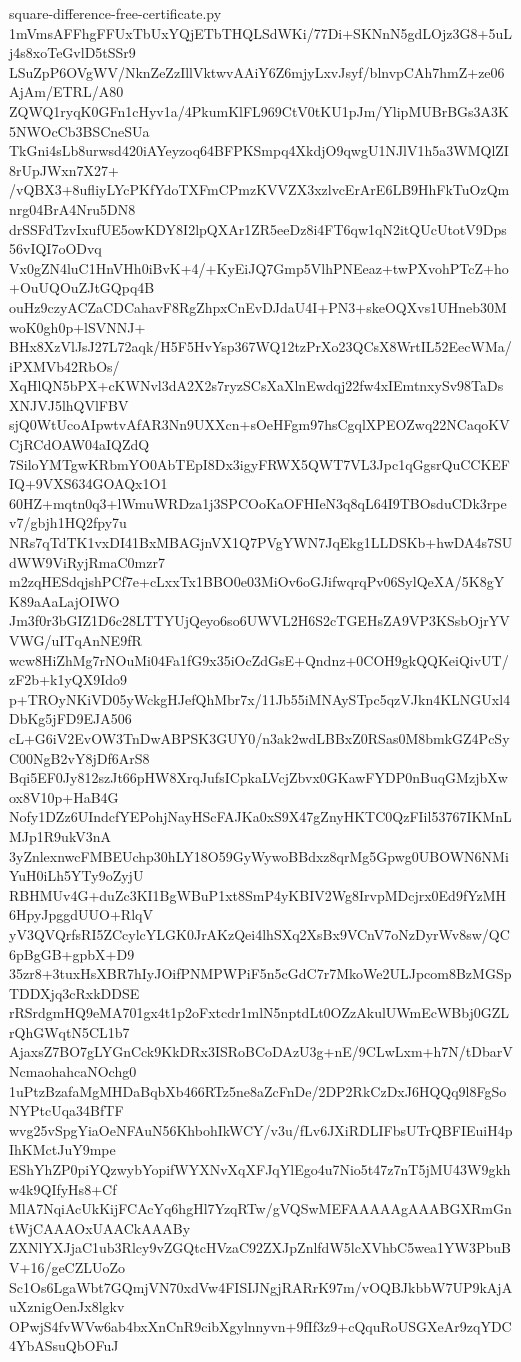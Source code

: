 \documentclass[11pt]{article}
\theoremstyle{definition}
\theoremstyle{remark}
\begin{document}
\begin{filecontents*}[overwrite]{square-difference-free-certificate.py}
1mVmsAFFhgFFUxTbUxYQjETbTHQLSdWKi/77Di+SKNnN5gdLOjz3G8+5uLj4s8xoTeGvlD5tSSr9
LSuZpP6OVgWV/NknZeZzIllVktwvAAiY6Z6mjyLxvJsyf/blnvpCAh7hmZ+ze06AjAm/ETRL/A80
ZQWQ1ryqK0GFn1cHyv1a/4PkumKlFL969CtV0tKU1pJm/YlipMUBrBGs3A3K5NWOcCb3BSCneSUa
TkGni4sLb8urwsd420iAYeyzoq64BFPKSmpq4XkdjO9qwgU1NJlV1h5a3WMQlZI8rUpJWxn7X27+
/vQBX3+8ufliyLYcPKfYdoTXFmCPmzKVVZX3xzlvcErArE6LB9HhFkTuOzQmnrg04BrA4Nru5DN8
drSSFdTzvIxufUE5owKDY8I2lpQXAr1ZR5eeDz8i4FT6qw1qN2itQUcUtotV9Dps56vIQI7oODvq
Vx0gZN4luC1HnVHh0iBvK+4/+KyEiJQ7Gmp5VlhPNEeaz+twPXvohPTcZ+ho+OuUQOuZJtGQpq4B
ouHz9czyACZaCDCahavF8RgZhpxCnEvDJdaU4I+PN3+skeOQXvs1UHneb30MwoK0gh0p+lSVNNJ+
BHx8XzVlJsJ27L72aqk/H5F5HvYsp367WQ12tzPrXo23QCsX8WrtIL52EecWMa/iPXMVb42RbOs/
XqHlQN5bPX+cKWNvl3dA2X2s7ryzSCsXaXlnEwdqj22fw4xIEmtnxySv98TaDsXNJVJ5lhQVlFBV
sjQ0WtUcoAIpwtvAfAR3Nn9UXXcn+sOeHFgm97hsCgqlXPEOZwq22NCaqoKVCjRCdOAW04aIQZdQ
7SiloYMTgwKRbmYO0AbTEpI8Dx3igyFRWX5QWT7VL3Jpc1qGgsrQuCCKEFIQ+9VXS634GOAQx1O1
60HZ+mqtn0q3+lWmuWRDza1j3SPCOoKaOFHIeN3q8qL64I9TBOsduCDk3rpev7/gbjh1HQ2fpy7u
NRs7qTdTK1vxDI41BxMBAGjnVX1Q7PVgYWN7JqEkg1LLDSKb+hwDA4s7SUdWW9ViRyjRmaC0mzr7
m2zqHESdqjshPCf7e+cLxxTx1BBO0e03MiOv6oGJifwqrqPv06SylQeXA/5K8gYK89aAaLajOIWO
Jm3f0r3bGIZ1D6c28LTTYUjQeyo6so6UWVL2H6S2cTGEHsZA9VP3KSsbOjrYVVWG/uITqAnNE9fR
wcw8HiZhMg7rNOuMi04Fa1fG9x35iOcZdGsE+Qndnz+0COH9gkQQKeiQivUT/zF2b+k1yQX9Ido9
p+TROyNKiVD05yWckgHJefQhMbr7x/11Jb55iMNAySTpc5qzVJkn4KLNGUxl4DbKg5jFD9EJA506
cL+G6iV2EvOW3TnDwABPSK3GUY0/n3ak2wdLBBxZ0RSas0M8bmkGZ4PcSyC00NgB2vY8jDf6ArS8
Bqi5EF0Jy812szJt66pHW8XrqJufsICpkaLVcjZbvx0GKawFYDP0nBuqGMzjbXwox8V10p+HaB4G
Nofy1DZz6UIndcfYEPohjNayHScFAJKa0xS9X47gZnyHKTC0QzFIil53767IKMnLMJp1R9ukV3nA
3yZnlexnwcFMBEUchp30hLY18O59GyWywoBBdxz8qrMg5Gpwg0UBOWN6NMiYuH0iLh5YTy9oZyjU
RBHMUv4G+duZc3KI1BgWBuP1xt8SmP4yKBIV2Wg8IrvpMDcjrx0Ed9fYzMH6HpyJpggdUUO+RlqV
yV3QVQrfsRI5ZCcylcYLGK0JrAKzQei4lhSXq2XsBx9VCnV7oNzDyrWv8sw/QC6pBgGB+gpbX+D9
35zr8+3tuxHsXBR7hIyJOifPNMPWPiF5n5cGdC7r7MkoWe2ULJpcom8BzMGSpTDDXjq3cRxkDDSE
rRSrdgmHQ9eMA701gx4t1p2oFxtcdr1mlN5nptdLt0OZzAkulUWmEcWBbj0GZLrQhGWqtN5CL1b7
AjaxsZ7BO7gLYGnCck9KkDRx3ISRoBCoDAzU3g+nE/9CLwLxm+h7N/tDbarVNcmaohahcaNOchg0
1uPtzBzafaMgMHDaBqbXb466RTz5ne8aZcFnDe/2DP2RkCzDxJ6HQQq9l8FgSoNYPtcUqa34BfTF
wvg25vSpgYiaOeNFAuN56KhbohIkWCY/v3u/fLv6JXiRDLIFbsUTrQBFIEuiH4pIhKMctJuY9mpe
EShYhZP0piYQzwybYopifWYXNvXqXFJqYlEgo4u7Nio5t47z7nT5jMU43W9gkhw4k9QIfyHs8+Cf
MlA7NqiAcUkKijFCAcYq6hgHl7YzqRTw/gVQSwMEFAAAAAgAAABGXRmGntWjCAAAOxUAACkAAABy
ZXNlYXJjaC1ub3Rlcy9vZGQtcHVzaC92ZXJpZnlfdW5lcXVhbC5wea1YW3PbuBV+16/geCZLUoZo
Sc1Os6LgaWbt7GQmjVN70xdVw4FISIJNgjRARrK97m/vOQBJkbbW7UP9kAjAuXznigOenJx8lgkv
OPwjS4fvWVw6ab4bxXnCnR9cibXgylnnyvn+9fIf3z9+cQquRoUSGXeAr9zqYDC4YbASsuQbOFuJ

\end{filecontents*}
\end{document}
